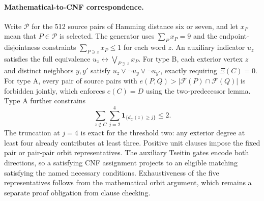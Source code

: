 \paragraph{Mathematical-to-CNF correspondence.}
Write $\mathcal P$ for the 512 source pairs of Hamming distance six
or seven, and let $x_P$ mean that $P\in\mathcal P$ is selected.
The generator uses $\sum_Px_P=9$ and the endpoint-disjointness
constraints $\sum_{P\ni z}x_P\le1$ for each word $z$. An auxiliary
indicator $u_z$ satisfies the full equivalence
$u_z\leftrightarrow\bigvee_{P\ni z}x_P$.
For type B, each exterior vertex $z$ and distinct neighbors $y,y'$
satisfy $u_z\lor\neg u_y\lor\neg u_{y'}$, exactly requiring
$\Xi(C)=0$. For type A, every pair of source pairs with
$e(P,Q)>|\mathcal F(P)\cap\mathcal F(Q)|$ is forbidden jointly,
which enforces $e(C)=D$ using the two-predecessor lemma.
Type A further constrains
\[
\sum_{z\notin C}\sum_{j=2}^{4}\mathbf1_{\{d_C(z)\ge j\}}\le2.
\]
The truncation at $j=4$ is exact for the threshold two:
any exterior degree at least four already contributes at least three.
Positive unit clauses impose the fixed pair or pair-pair orbit
representatives. The auxiliary Tseitin gates encode both directions,
so a satisfying CNF assignment projects to an eligible matching
satisfying the named necessary conditions. Exhaustiveness of the
five representatives follows from the mathematical orbit argument,
which remains a separate proof obligation from clause checking.
